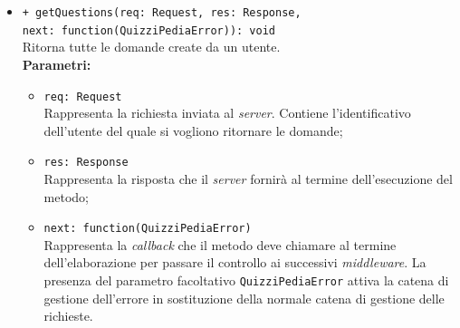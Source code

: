\begin{itemize}
\begin{itemize}
					\item \texttt{+ getQuestions(req: Request, res: Response,\\ next: function(QuizziPediaError)): void}\\
					Ritorna tutte le domande create da un utente.\\
					\textbf{Parametri:}
					\begin{itemize}
					\item \texttt{req: Request} \\
						Rappresenta la richiesta inviata al \textit{server}. Contiene l'identificativo dell'utente del quale si vogliono ritornare le domande;
						\item \texttt{res: Response} \\
						Rappresenta la risposta che il \textit{server} fornirà al termine dell'esecuzione del metodo;
						\item \texttt{next: function(QuizziPediaError)} \\
						Rappresenta la \textit{callback} che il metodo deve chiamare al termine dell'elaborazione per passare il controllo ai successivi \textit{middleware}. La presenza del parametro facoltativo \texttt{QuizziPediaError} attiva la catena di gestione dell'errore in sostituzione della normale catena di gestione delle richieste.
					\end{itemize}
			\end{itemize}
	\end{itemize}